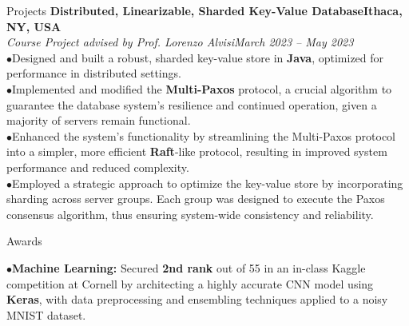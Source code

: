 \documentclass{resume} %
\begin{document}
\begin{rSection}{Projects}
{\bf Distributed, Linearizable, Sharded Key-Value Database}\hfill{\textbf{Ithaca, NY, USA}}
\\{\em Course Project advised by Prof. Lorenzo Alvisi}\hfill {\em March 2023 -- May 2023}
\\ $ \bullet $Designed and built a robust, sharded key-value store in \textbf{Java}, optimized for performance in distributed settings.
\\ $ \bullet $Implemented and modified the \textbf{Multi-Paxos} protocol, a crucial algorithm to guarantee the database system's resilience and continued operation, given a majority of servers remain functional.
\\ $ \bullet $Enhanced the system's functionality by streamlining the Multi-Paxos protocol into a simpler, more efficient \textbf{Raft}-like protocol, resulting in improved system performance and reduced complexity.
\\ $ \bullet $Employed a strategic approach to optimize the key-value store by incorporating sharding across server groups. Each group was designed to execute the Paxos consensus algorithm, thus ensuring system-wide consistency and reliability.

\end{rSection}



\begin{rSection}{Awards}

$ \bullet $\textbf{Machine Learning:} Secured \textbf{2nd rank} out of 55 in an in-class Kaggle competition at Cornell by architecting a highly accurate CNN model using \textbf{Keras}, with data preprocessing and ensembling techniques applied to a noisy MNIST dataset.

\end{rSection}

\newpage
\end{document}
